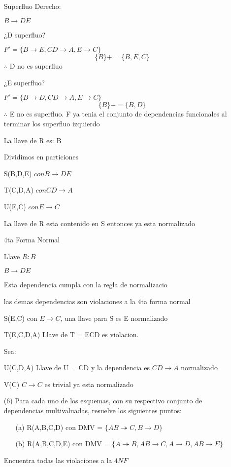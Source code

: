 \documentclass{article}
\begin{document}
\begin{enumerate}
    Superfluo Derecho:

    $B \rightarrow DE$

    ¿D superfluo?

    $F'=\{B \rightarrow E, CD \rightarrow A, E\rightarrow C\}$\\
    $$\{ B\}+=\{ B,E,C\}$$
    $\therefore$ D no es superfluo

    ¿E superfluo?

    $F'=\{ B \rightarrow D, CD \rightarrow A, E \rightarrow C\}$\\
    $$\{ B\}+=\{ B,D\}$$
    $\therefore$ E no es superfluo.
    F ya tenia el conjunto de dependencias funcionales al terminar los superfluo izquierdo

    La llave de R es: B

    Dividimos en particiones

    S(B,D,E) $con B \rightarrow DE$

    T(C,D,A) $con CD \rightarrow A$

    U(E,C) $con E \rightarrow C$

    La llave de R esta contenido en S entonces ya esta normalizado

    4ta Forma Normal

    Llave $R: B$

    $B\rightarrow DE$

    Esta dependencia cumpla con la regla de normalizacio

    las demas dependencias son violaciones a la 4ta forma normal

    S(E,C) con $E \rightarrow C$, una llave para S es E normalizado

    T(E,C,D,A) Llave de T = ECD es violacion.

    Sea:

    U(C,D,A) Llave de U = CD y la dependencia es $CD \rightarrow A$ normalizado

    V(C) $C\rightarrow C$ es trivial ya esta normalizado

    \item[(6)] Para cada uno de los esquemas, con su respectivo conjunto de dependencias multivaluadas,
    resuelve los siguientes puntos:
    \begin{enumerate}
      \item[(a)] R(A,B,C,D) con DMV = $ \{ AB \twoheadrightarrow C, B
      \rightarrow D \} $
      \item[(b)] R(A,B,C,D,E) con DMV = $\{ A \twoheadrightarrow B, AB
      \rightarrow C, A \rightarrow D, AB \rightarrow E\}$
    \end{enumerate}
    Encuentra todas las violaciones a la $4NF$


\end{enumerate}
\end{document}
